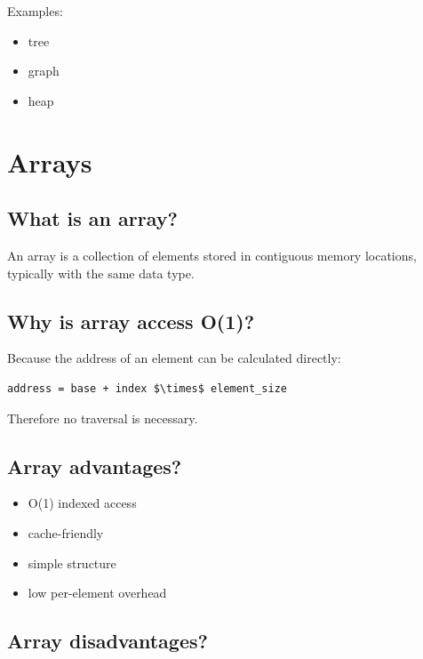 Examples:

\begin{itemize}
  \item tree
  \item graph
  \item heap
\end{itemize}

\medskip

\section{Arrays}

\subsection{What is an array?}

An array is a collection of elements stored in contiguous memory locations, typically with the same data type.

\medskip

\subsection{Why is array access O(1)?}

Because the address of an element can be calculated directly:

\begin{lstlisting}
address = base + index $\times$ element_size
\end{lstlisting}

Therefore no traversal is necessary.

\medskip

\subsection{Array advantages?}

\begin{itemize}
  \item O(1) indexed access
  \item cache-friendly
  \item simple structure
  \item low per-element overhead
\end{itemize}

\medskip

\subsection{Array disadvantages?}

